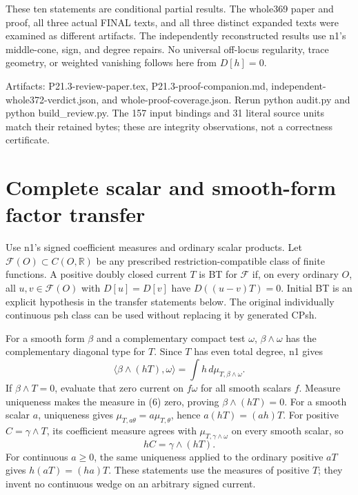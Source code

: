 \documentclass[11pt]{article}
\begin{document}
These ten statements are conditional partial results. The whole369 paper and proof, all three actual FINAL texts, and all three distinct expanded texts were examined as different artifacts. The independently reconstructed results use n1's middle-cone, sign, and degree repairs. No universal off-locus regularity, trace geometry, or weighted vanishing follows here from \(D[h]=0\).

Artifacts: P21.3-review-paper.tex, P21.3-proof-companion.md, independent-whole372-verdict.json, and whole-proof-coverage.json. Rerun python audit.py and python build\_review.py. The 157 input bindings and 31 literal source units match their retained bytes; these are integrity observations, not a correctness certificate.

\section{Complete scalar and smooth-form factor transfer}


Use n1's signed coefficient measures and ordinary scalar products. Let \(\mathcal F(O)\subset C(O,\mathbb R)\) be any prescribed restriction-compatible class of finite functions. A positive doubly closed current \(T\) is BT for \(\mathcal F\) if, on every ordinary \(O\), all \(u,v\in\mathcal F(O)\) with \(D[u]=D[v]\) have \(D((u-v)T)=0\). Initial BT is an explicit hypothesis in the transfer statements below. The original individually continuous psh class can be used without replacing it by generated CPsh.

For a smooth form \(\beta\) and a complementary compact test \(\omega\), \(\beta\wedge\omega\) has the complementary diagonal type for \(T\). Since \(T\) has even total degree, n1 gives
\[
 \langle\beta\wedge(hT),\omega\rangle
 =\int h\,d\mu_{T,\beta\wedge\omega}.                                    \tag{6}
\]
If \(\beta\wedge T=0\), evaluate that zero current on \(f\omega\) for all smooth scalars \(f\). Measure uniqueness makes the measure in (6) zero, proving \(\beta\wedge(hT)=0\). For a smooth scalar \(a\), uniqueness gives \(\mu_{T,a\theta}=a\mu_{T,\theta}\), hence \(a(hT)=(ah)T\). For positive \(C=\gamma\wedge T\), its coefficient measure agrees with \(\mu_{T,\gamma\wedge\omega}\) on every smooth scalar, so
\[
 hC=\gamma\wedge(hT).                                                     \tag{7}
\]
For continuous \(a\geq0\), the same uniqueness applied to the ordinary positive \(aT\) gives \(h(aT)=(ha)T\). These statements use the measures of positive \(T\); they invent no continuous wedge on an arbitrary signed current.
\end{document}
